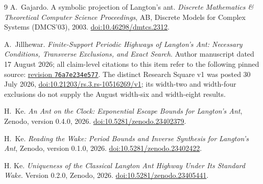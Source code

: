 \documentclass[11pt]{article}
\theoremstyle{definition}\newtheorem{definition}[theorem]{Definition}
\begin{document}




\begin{thebibliography}{9}
A.~Gajardo. A symbolic projection of Langton's ant.
\emph{Discrete Mathematics \& Theoretical Computer Science Proceedings},
AB, Discrete Models for Complex Systems (DMCS'03), 2003.
\href{https://doi.org/10.46298/dmtcs.2312}{doi:10.46298/dmtcs.2312}.

A.~Jillhewar. \emph{Finite-Support Periodic Highways of Langton's Ant:
Necessary Conditions, Transverse Exclusions, and Exact Search}.
Author manuscript dated 17 August 2026; all claim-level citations to this item
refer to the following pinned source:
\href{https://github.com/Atharva12456/langtons-ant-highway/blob/76a7e234e577d992d086c204c3dea00ae72cf10a/paper/main.tex}
{revision \texttt{76a7e234e577}}.
The distinct Research Square v1 was posted 30 July 2026,
\href{https://doi.org/10.21203/rs.3.rs-10516269/v1}{doi:10.21203/rs.3.rs-10516269/v1};
its width-two and width-four exclusions do not supply the August width-six
and width-eight results.

H.~Ke. \emph{An Ant on the Clock: Exponential Escape Bounds for Langton's Ant},
Zenodo, version 0.4.0, 2026.
\href{https://doi.org/10.5281/zenodo.23402379}{doi:10.5281/zenodo.23402379}.

H.~Ke. \emph{Reading the Wake: Period Bounds and Inverse Synthesis for
Langton's Ant}, Zenodo, version 0.1.0, 2026.
\href{https://doi.org/10.5281/zenodo.23402422}{doi:10.5281/zenodo.23402422}.

 H. Ke.
\newblock \emph{Uniqueness of the Classical Langton Ant Highway Under Its Standard Wake}.
\newblock Version 0.2.0, Zenodo, 2026.
\newblock \href{https://doi.org/10.5281/zenodo.23405441}{doi:10.5281/zenodo.23405441}.
\end{thebibliography}
\end{document}
